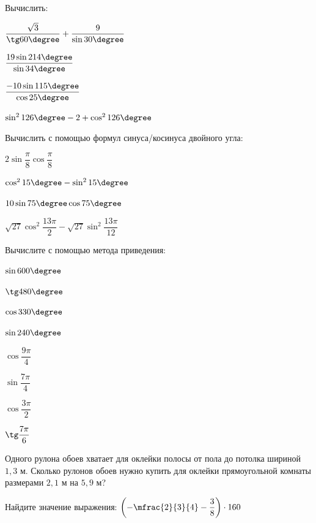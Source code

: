 \begin{homework}[number=1]
	\begin{listofex}
		\item Вычислить:
		\begin{enumcols}[itemcolumns=2]
			\item \( \dfrac{\sqrt{3}}{\tg60\degree}+\dfrac{9}{\sin30\degree} \)
			\item \( \dfrac{19\sin214\degree}{\sin34\degree} \)
			\item \( \dfrac{-10\sin115\degree}{\cos25\degree} \)
			\item \( \sin^2126\degree-2+\cos^2126\degree \)
		\end{enumcols}
		\item Вычислить с помощью формул синуса/косинуса двойного угла:
		\begin{enumcols}[itemcolumns=2]
			\item \( 2\sin\dfrac{\pi}{8}\cos\dfrac{\pi}{8} \)
			\item \( \cos^215\degree-\sin^215\degree \)
			\item \( 10\sin75\degree\cos75\degree \)
			\item \( \sqrt{27}\cos^2\dfrac{13\pi}{2}-\sqrt{27}\sin^2\dfrac{13\pi}{12} \)
		\end{enumcols}
		\item Вычислите с помощью метода приведения:
		\begin{enumcols}[itemcolumns=6]
			\item \( \sin600\degree \)
			\item \( \tg480\degree \)
			\item \( \cos330\degree \)
			\item \( \sin240\degree \)
			\item \( \cos\dfrac{9\pi}{4} \)
			\item \( \sin\dfrac{7\pi}{4} \)
			\item \( \cos\dfrac{3\pi}{2} \)
			\item \( \tg\dfrac{7\pi}{6} \)
		\end{enumcols}
	\item Одного рулона обоев хватает для оклейки полосы от пола до потолка шириной \( 1,3 \) м. Сколько рулонов обоев нужно купить для оклейки прямоугольной комнаты размерами \(  2,1 \) м на \( 5,9 \) м?
	\item Найдите значение выражения: \( \left( -\mfrac{2}{3}{4}-\dfrac{3}{8} \right)\cdot160 \)
	\end{listofex}
\end{homework}
